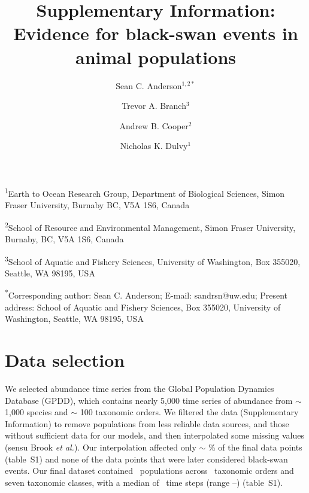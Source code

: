 \documentclass[12pt]{article}
\title{Supplementary Information:\\Evidence for black-swan events in animal
  populations}
\author{
Sean C. Anderson$^{1,2*}$ \and
Trevor A. Branch$^3$ \and
Andrew B. Cooper$^2$ \and
Nicholas K. Dulvy$^1$
}
\date{}
\begin{document}
\nocite{taleb2007,sornette2009}
\nocite{meehl2004,katz2005,ipcc2012}
\nocite{taleb2007,sornette2009,may2008}
\nocite{taleb2007}
\nocite{newman2005}
\nocite{sornette2009}
\nocite{harnik2012}
\nocite{fey2015}
\nocite{mangel1994}
\nocite{ipcc2012}
\nocite{keitt1998,allen2001,halley2002}
\nocite{brook2006a,knape2012}
\nocite{SOM}
\nocite{saucy1994}
\nocite{stafford1971}
\nocite{stafford1971}
\nocite{potts1980}
\nocite{potts1980}
\nocite{allen2001}
\nocite{schindler2010}
\nocite{carpenter2006}
\nocite{nunez2012}
\nocite{meehl2004,katz2005,ipcc2012}
\nocite{kirby2009}
\nocite{denny2009}
\nocite{nrc2007}
\nocite{caddy1996}
\nocite{schindler2010}
\nocite{doak2008,lindenmayer2010}
\nocite{mangel1994}
\nocite{loreau2010a,thompson2013}
\nocite{meehl2004,ipcc2012,thompson2013}
\nocite{rachev2008}


\maketitle

\textsuperscript{1}Earth to Ocean Research Group, Department of Biological
Sciences, Simon Fraser University, Burnaby BC, V5A 1S6, Canada

\textsuperscript{2}School of Resource and Environmental Management, Simon
Fraser University, Burnaby, BC, V5A 1S6, Canada

\textsuperscript{3}School of Aquatic and Fishery Sciences, University of
Washington, Box 355020, Seattle, WA 98195, USA

\textsuperscript{*}Corresponding author: Sean C. Anderson; E-mail: sandrsn@uw.edu; Present address: School of Aquatic and Fishery Sciences, Box 355020, University of Washington, Seattle, WA 98195, USA

\linenumbers
\onehalfspacing




\section{Data selection}

We selected abundance time series from the Global Population Dynamics Database\cite{gpdd2010} (GPDD), which contains nearly 5,000 time series of abundance from \(\sim\) 1,000 species and \(\sim\) 100 taxonomic orders. We filtered the data (Supplementary Information) to remove populations from less reliable data sources, and those without sufficient data for our models, and then interpolated some missing values (sensu Brook \textit{et al.}\cite{brook2006a}). Our interpolation affected only \(\sim\) \interpPointsPerc \% of the final data points (table~S1) and none of the data points that were later considered black-swan events. Our final dataset contained \NPops\ populations across \NOrders\ taxonomic orders and seven taxonomic classes, with a median of \medianTimeSteps\ time steps (range \minTimeSteps--\maxTimeSteps) (table~S1).
\end{document}
